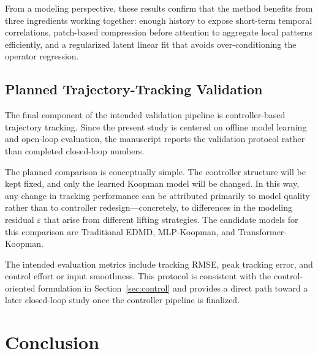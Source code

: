 \documentclass[journal]{IEEEtran}
\begin{document}
From a modeling perspective, these results confirm that the method benefits from three ingredients working together: enough history to expose short-term temporal correlations, patch-based compression before attention to aggregate local patterns efficiently, and a regularized latent linear fit that avoids over-conditioning the operator regression.

\subsection{Planned Trajectory-Tracking Validation}

The final component of the intended validation pipeline is controller-based trajectory tracking. Since the present study is centered on offline model learning and open-loop evaluation, the manuscript reports the validation protocol rather than completed closed-loop numbers.

The planned comparison is conceptually simple. The controller structure will be kept fixed, and only the learned Koopman model will be changed. In this way, any change in tracking performance can be attributed primarily to model quality rather than to controller redesign---concretely, to differences in the modeling residual $\varepsilon$ that arise from different lifting strategies. The candidate models for this comparison are Traditional EDMD, MLP-Koopman, and Transformer-Koopman.

The intended evaluation metrics include tracking RMSE, peak tracking error, and control effort or input smoothness. This protocol is consistent with the control-oriented formulation in Section~\ref{sec:control} and provides a direct path toward a later closed-loop study once the controller pipeline is finalized.

\section{Conclusion}
\label{sec:conclusion}
\end{document}
